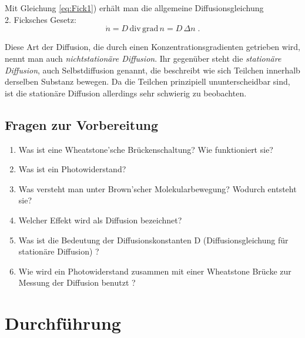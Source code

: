 Mit Gleichung \ref{eq:Fick1}) erhält man die allgemeine Diffusionsgleichung\\

2. Ficksches Gesetz:
\begin{equation}
 \dot{n} = D\,\mathrm{div}\,\mathrm{grad}\, n = D\,\Delta n\; .
\end{equation}

Diese Art der Diffusion, die durch einen Konzentrationsgradienten getrieben wird, nennt man auch \textit{nichtstationäre Diffusion}. Ihr gegenüber steht die \textit{stationäre Diffusion}, auch Selbstdiffusion genannt, die beschreibt wie sich Teilchen innerhalb derselben Substanz bewegen. Da die Teilchen prinzipiell ununterscheidbar sind, ist die stationäre Diffusion allerdings sehr schwierig zu beobachten.

\begin{tutorhint}
\section{Fragen zur Vorbereitung}

\begin{enumerate}
 \item Was ist eine Wheatstone'sche Brückenschaltung? Wie funktioniert sie?
 \item Was ist ein Photowiderstand?
 \item Was versteht man unter Brown'scher Molekularbewegung? Wodurch entsteht sie?
 \item Welcher Effekt wird als Diffusion bezeichnet?
 \item Was ist die Bedeutung der Diffusionskonstanten D (Diffusionsgleichung für stationäre Diffusion) ?
 \item Wie wird ein Photowiderstand zusammen mit einer Wheatstone Brücke zur Messung der Diffusion benutzt ?
%
\end{enumerate}
\end{tutorhint}

\section{Durchführung} 

